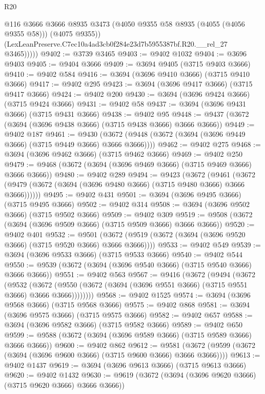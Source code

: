 \begin{lexlean}{R20}
\begin{coremodule}
              @116
              @3666
              @3666
              @8935
              @3473
              (@4050 @9355 @58 @8935 (@4055 (@4056 @9355 @58)))
              (@4075 @9355))
            (LexLeanPreserve.C7ec10a4ad3cb0f284e23d7b5955387bf.R20.__rel_27 @3465)))))
@9402 := @3739 @3465
@9403 := @9402 @1032
@9404 := @3696 @9403
@9405 := @9404 @3666
@9409 := @3694 @9405 (@3715 @9403 @3666)
@9410 := @9402 @584
@9416 := @3694 (@3696 @9410 @3666) (@3715 @9410 @3666)
@9417 := @9402 @295
@9423 := @3694 (@3696 @9417 @3666) (@3715 @9417 @3666)
@9424 := @9402 @200
@9430 := @3694 (@3696 @9424 @3666) (@3715 @9424 @3666)
@9431 := @9402 @58
@9437 := @3694 (@3696 @9431 @3666) (@3715 @9431 @3666)
@9438 := @9402 @95
@9448 := @9437 (@3672 (@3694 (@3696 @9438 @3666) (@3715 @9438 @3666) @3666 @3666))
@9449 := @9402 @187
@9461 := @9430 (@3672 (@9448 (@3672 (@3694 (@3696 @9449 @3666) (@3715 @9449 @3666) @3666 @3666))))
@9462 := @9402 @275
@9468 := @3694 (@3696 @9462 @3666) (@3715 @9462 @3666)
@9469 := @9402 @250
@9479 := @9468 (@3672 (@3694 (@3696 @9469 @3666) (@3715 @9469 @3666) @3666 @3666))
@9480 := @9402 @289
@9494 := @9423
    (@3672
      (@9461 (@3672 (@9479 (@3672 (@3694 (@3696 @9480 @3666) (@3715 @9480 @3666) @3666 @3666))))))
@9495 := @9402 @431
@9501 := @3694 (@3696 @9495 @3666) (@3715 @9495 @3666)
@9502 := @9402 @314
@9508 := @3694 (@3696 @9502 @3666) (@3715 @9502 @3666)
@9509 := @9402 @309
@9519 := @9508 (@3672 (@3694 (@3696 @9509 @3666) (@3715 @9509 @3666) @3666 @3666))
@9520 := @9402 @401
@9532 := @9501 (@3672 (@9519 (@3672 (@3694 (@3696 @9520 @3666) (@3715 @9520 @3666) @3666 @3666))))
@9533 := @9402 @549
@9539 := @3694 (@3696 @9533 @3666) (@3715 @9533 @3666)
@9540 := @9402 @544
@9550 := @9539 (@3672 (@3694 (@3696 @9540 @3666) (@3715 @9540 @3666) @3666 @3666))
@9551 := @9402 @563
@9567 := @9416
    (@3672
      (@9494
        (@3672
          (@9532
            (@3672 (@9550 (@3672 (@3694 (@3696 @9551 @3666) (@3715 @9551 @3666) @3666 @3666))))))))
@9568 := @9402 @1525
@9574 := @3694 (@3696 @9568 @3666) (@3715 @9568 @3666)
@9575 := @9402 @868
@9581 := @3694 (@3696 @9575 @3666) (@3715 @9575 @3666)
@9582 := @9402 @657
@9588 := @3694 (@3696 @9582 @3666) (@3715 @9582 @3666)
@9589 := @9402 @650
@9599 := @9588 (@3672 (@3694 (@3696 @9589 @3666) (@3715 @9589 @3666) @3666 @3666))
@9600 := @9402 @862
@9612 := @9581 (@3672 (@9599 (@3672 (@3694 (@3696 @9600 @3666) (@3715 @9600 @3666) @3666 @3666))))
@9613 := @9402 @1437
@9619 := @3694 (@3696 @9613 @3666) (@3715 @9613 @3666)
@9620 := @9402 @1432
@9630 := @9619 (@3672 (@3694 (@3696 @9620 @3666) (@3715 @9620 @3666) @3666 @3666))

\end{coremodule}
\end{lexlean}
